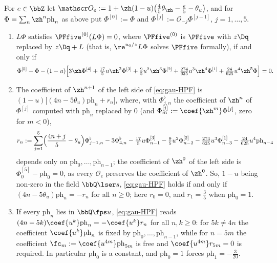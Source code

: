 \begin{lem}[HPF]
\label{lem:gau-HPF}
For $e\in\bbZ$ let $\mathscr O_e:=1+\zh(1-u)\bigl(\tfrac45\theta_{\zh}-\tfrac e5-\theta_u\bigr)$, and for $\Phi=\sum_n\zh^n\mathrm{ph}_n$ as above put $\Phi^{[0]}:=\Phi$ and $\Phi^{[j]}:=\mathscr O_{-j}\Phi^{[j-1]}$, $j=1,\dots,5$.
\begin{enumerate}
\item $L\Phi$ satisfies $\PFfive^{(0)}(L\Phi)=0$, where $\PFfive^{(0)}$ is $\PFfive$ with $z\Dq$ replaced by $z\Dq+L$ (that is, $\re^{u_0/z}L\Phi$ solves $\PFfive$ formally), if and only if
\begin{equation}
\label{eq:gau-HPF}
\Phi^{[5]}-\Phi-(1-u)\Bigl[3\zh\Phi^{[4]}+\tfrac{17}5u\zh^2\Phi^{[3]}+\tfrac95u^2\zh^3\Phi^{[2]}+\tfrac{274}{625}u^3\zh^4\Phi^{[1]}+\tfrac{24}{625}u^4\zh^5\Phi\Bigr]=0 .
\end{equation}
\item The coefficient of $\zh^{n+1}$ of the left side of \eqref{eq:gau-HPF} is $(1-u)\bigl[(4n-5\theta_u)\mathrm{ph}_n+r_n\bigr]$, where, with $\Phi^\flat_{j,n}$ the coefficient of $\zh^n$ of $\Phi^{[j]}$ computed with $\mathrm{ph}_n$ replaced by $0$ (and $\Phi^{[j]}_m:=\coef{\zh^m}\Phi^{[j]}$, zero for $m<0$),
\[
r_n:=\sum_{j=1}^5\Bigl(\frac{4n+j}5-\theta_u\Bigr)\Phi^\flat_{j-1,n}-3\Phi^\flat_{4,n}-\tfrac{17}5u\Phi^{[3]}_{n-1}-\tfrac95u^2\Phi^{[2]}_{n-2}-\tfrac{274}{625}u^3\Phi^{[1]}_{n-3}-\tfrac{24}{625}u^4\mathrm{ph}_{n-4}
\]
depends only on $\mathrm{ph}_0,\dots,\mathrm{ph}_{n-1}$; the coefficient of $\zh^0$ of the left side is $\Phi^{[5]}_0-\mathrm{ph}_0=0$, as every $\mathscr O_e$ preserves the coefficient of $\zh^0$. So, $1-u$ being non-zero in the field $\bbQ\lser s$, \eqref{eq:gau-HPF} holds if and only if $(4n-5\theta_u)\mathrm{ph}_n=-r_n$ for all $n\geq0$; here $r_0=0$, and $r_1=\frac35$ when $\mathrm{ph}_0=1$.
\item If every $\mathrm{ph}_n$ lies in $\bbQ\fps u$, \eqref{eq:gau-HPF} reads $(4n-5k)\coef{u^k}\mathrm{ph}_n=-\coef{u^k}r_n$ for all $n,k\geq0$: for $5k\neq4n$ the coefficient $\coef{u^k}\mathrm{ph}_n$ is fixed by $\mathrm{ph}_0,\dots,\mathrm{ph}_{n-1}$, while for $n=5m$ the coefficient $\fc_m:=\coef{u^{4m}}\mathrm{ph}_{5m}$ is free and $\coef{u^{4m}}r_{5m}=0$ is required. In particular $\mathrm{ph}_0$ is a constant, and $\mathrm{ph}_0=1$ forces $\mathrm{ph}_1=-\frac3{20}$.
\end{enumerate}
\end{lem}

